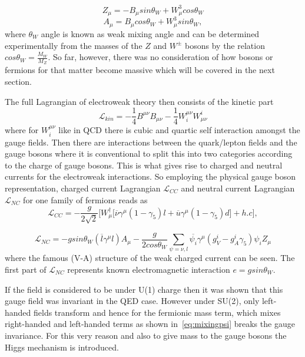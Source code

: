 \begin{equation}
	Z_{\mu}=-B_{\mu}sin\theta_{W}+W^{3}_{\mu}cos\theta_{W}
\end{equation}
\begin{equation}
	A_{\mu}= B_{\mu}cos\theta_{W}+W^{3}_{\mu}sin\theta_{W},
\end{equation}
where $\theta_{W}$ angle is known as weak mixing angle and can be determined experimentally from the masses of the $Z$ and $W^{\pm}$ bosons by the relation
$cos\theta_{W} = \frac{M_{W}}{M_{Z}}$. So far, however, there was no consideration of how bosons or fermions for that matter become massive which will be covered in the next section.

The full Lagrangian of electroweak theory then consists of the kinetic part
\begin{equation}
\mathcal{L}_{kin}=  -\frac{1}{4} B^{\mu\nu}B_{\mu\nu} -\frac{1}{4} W_{i}^{\mu\nu}W^{i}_{\mu\nu}
\end{equation}
where for $W_{i}^{\mu\nu}$ like in \gls{QCD} there is cubic and quartic self interaction amongst the gauge fields. Then there are interactions between the quark/lepton fields and the gauge bosons where it is conventional to split this into two categories according to the charge of gauge bosons.
This is what gives rise to charged and neutral currents for the electroweak interactions. So employing the physical gauge boson representation, charged current Lagrangian $\mathcal{L}_{CC}$ and neutral current Lagrangian $\mathcal{L}_{NC}$ for one family of fermions reads as
\begin{equation}
	\mathcal{L}_{CC}= - \frac{g}{2\sqrt{2}}\Big[W_{\mu}^{\dagger}\big[\overline{\nu}\gamma^{\mu}(1-\gamma_{5})l + \overline{u}\gamma^{\mu}(1-\gamma_{5})d\big] + h.c\Big], 
\label{eq:LC}
\end{equation}

\begin{equation}
	\mathcal{L}_{NC}= - g sin\theta_{W}(\overline{l}\gamma^{\mu}l)A_{\mu} - \frac{g}{2cos\theta_{W}}\sum_{\psi=\nu,l} \overline{\psi_{i}}\gamma^{\mu}(g^{i}_{V} - g^{i}_{A}\gamma_{5})\psi_{i}Z_{\mu}
\label{eq:NC}
\end{equation}
where the famous (V-A) structure of the weak charged current can be seen. The first part of $\mathcal{L}_{NC}$ represents known electromagnetic interaction $e=gsin\theta_{W}$. 

If the field is considered to be under U(1) charge then it was shown that this gauge field was invariant in the QED case. However under SU(2), only left-handed fields transform and hence for the fermionic mass term, which mixes right-handed and left-handed terms as shown in~\autoref{eq:mixingpsi} breaks the gauge invariance.
For this very reason and also to give mass to the gauge bosons the Higgs mechanism is introduced.


